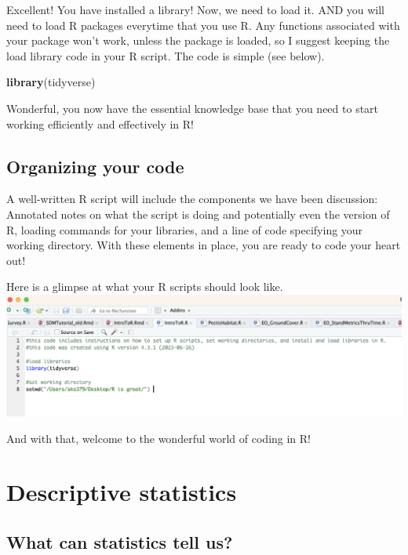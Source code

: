 \documentclass[
]{book}
\newenvironment{Shaded}{\begin{snugshade}}{\end{snugshade}}
\newcommand{\FunctionTok}[1]{\textcolor[rgb]{0.13,0.29,0.53}{\textbf{#1}}}
\newcommand{\NormalTok}[1]{#1}
\begin{document}
Excellent! You have installed a library! Now, we need to load it. AND you will need to load R packages everytime that you use R. Any functions associated with your package won't work, unless the package is loaded, so I suggest keeping the load library code in your R script. The code is simple (see below).

\begin{Shaded}
\begin{Highlighting}[]
\FunctionTok{library}\NormalTok{(tidyverse)}
\end{Highlighting}
\end{Shaded}

Wonderful, you now have the essential knowledge base that you need to start working efficiently and effectively in R!

\hypertarget{organizing-your-code}{%
\section{Organizing your code}\label{organizing-your-code}}

A well-written R script will include the components we have been discussion: Annotated notes on what the script is doing and potentially even the version of R, loading commands for your libraries, and a line of code specifying your working directory. With these elements in place, you are ready to code your heart out!

Here is a glimpse at what your R scripts should look like.
\includegraphics{images/01-intro/RScriptSetUp.png}

And with that, welcome to the wonderful world of coding in R!

\hypertarget{descriptive-statistics}{%
\chapter{Descriptive statistics}\label{descriptive-statistics}}

\hypertarget{what-can-statistics-tell-us}{%
\section{What can statistics tell us?}\label{what-can-statistics-tell-us}}
\end{document}
